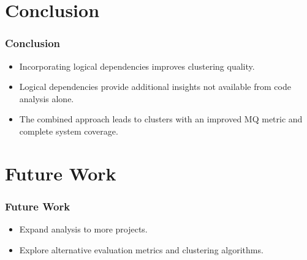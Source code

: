 \documentclass{beamer}
\begin{document}
\section{Conclusion}

\begin{frame}
\frametitle{Conclusion}
\begin{itemize}
    \item Incorporating logical dependencies improves clustering quality.
    \item Logical dependencies provide additional insights not available from code analysis alone.
    \item The combined approach leads to clusters with an improved MQ metric and complete system coverage.
\end{itemize}
\end{frame}

\section{Future Work}

\begin{frame}
\frametitle{Future Work}
\begin{itemize}
    \item Expand analysis to more projects.
    \item Explore alternative evaluation metrics and clustering algorithms.
\end{itemize}
\end{frame}
\end{document}
